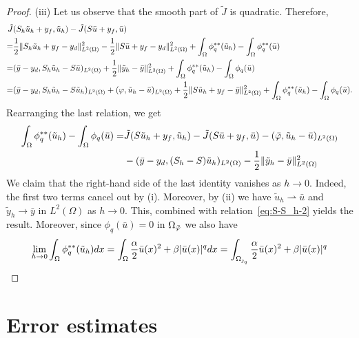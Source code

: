 \begin{proof}
(iii) Let us observe that the smooth part of $\tilde J$ is quadratic. Therefore,%
\begin{align*}
\tilde J&(S_h \tilde u_h +y_f, \tilde u_h ) - \tilde J(S \bar u +y_f, \bar u)\\
   =& \frac{1}{2}\| S_h \tilde u_h+y_f-y_d \|^2_{L^2(\Omega)} - \frac{1}{2}\|  S \bar u+y_f-y_d \|^2_{L^2(\Omega)} + \int_{\Omega} \phi_q^{**}(\tilde u_h)  - \int_{\Omega} \phi_q^{**}(\bar u)  \\
	=& (\bar y - y_d, S_h\tilde u_h - S\bar u)_{L^2(\Omega)} +  \frac{1}{2}\|\tilde y_h-\bar y\|^2_{L^2(\Omega)} +  \int_{\Omega} \phi_q^{**}(\tilde u_h)  - \int_{\Omega} \phi_q(\bar u)  \\
	=& (\bar y - y_d, S_h\tilde u_h - S\tilde u_h)_{L^2(\Omega)} + (\varphi,  \tilde u_h -\bar u)_{L^2(\Omega)} + \frac{1}{2}\|S\tilde u_h+y_f-\bar y\|^2_{L^2(\Omega)}+  \int_{\Omega} \phi_q^{**}(\tilde u_h)  - \int_{\Omega} \phi_q(\bar u).
\end{align*}
Rearranging the last relation, we get
\begin{align*}
	\int_{\Omega} \phi_q^{**}(\tilde u_h)  - \int_{\Omega} \phi_q(\bar u) = & \tilde J(S \tilde u_h +y_f, \tilde u_h ) - \tilde J(S \bar u + y_f, \bar u ) -(\bar\varphi ,\tilde u_h - \bar u)_{L^2(\Omega)} \\ 
	&-(\bar y - y_d, (S_h-S)\tilde u_h)_{L^2(\Omega)}  -    \frac{1}{2}\|\tilde y_h -\bar y\|^2_{L^2(\Omega)}
\end{align*}
We claim that the right-hand side of the last identity vanishes as $h \to 0$. Indeed, the first two terms cancel out by (i). Moreover, by (ii) we have 
$\tilde u_h \rightharpoonup \bar u$ and $\tilde y_h \to \bar y$ in $L^2(\Omega)$ as $h \to 0$. This, combined with relation~\eqref{eq:S-S_h-2} yields the result. Moreover, since $\phi_q(\bar u) = 0$ in $\Omega_{\bar\varphi}$   we also have
$$\lim_{h\to 0} \int_{\Omega} \phi_q^{**}(\tilde u_h)dx =\int_{\Omega} \frac{\alpha}{2} \bar u(x)^2 + \beta |\bar u (x)|^q dx=\int_{\Omega_{\operatorname{\jmath}_q}} \frac{\alpha}{2} \bar u(x)^2 + \beta |\bar u(x)|^q$$

\end{proof}



\section{Error estimates}


